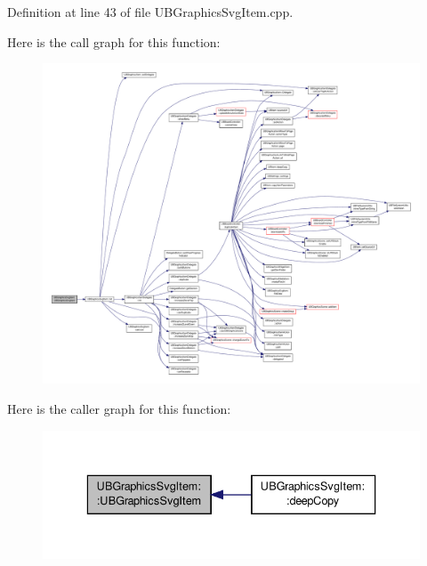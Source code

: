 Definition at line 43 of file U\-B\-Graphics\-Svg\-Item.\-cpp.



Here is the call graph for this function\-:
\nopagebreak
\begin{figure}[H]
\begin{center}
\leavevmode
\includegraphics[width=350pt]{d1/dce/class_u_b_graphics_svg_item_a47ac7a4adf4bb678692aa98cc30809bf_cgraph}
\end{center}
\end{figure}




Here is the caller graph for this function\-:
\nopagebreak
\begin{figure}[H]
\begin{center}
\leavevmode
\includegraphics[width=336pt]{d1/dce/class_u_b_graphics_svg_item_a47ac7a4adf4bb678692aa98cc30809bf_icgraph}
\end{center}
\end{figure}


